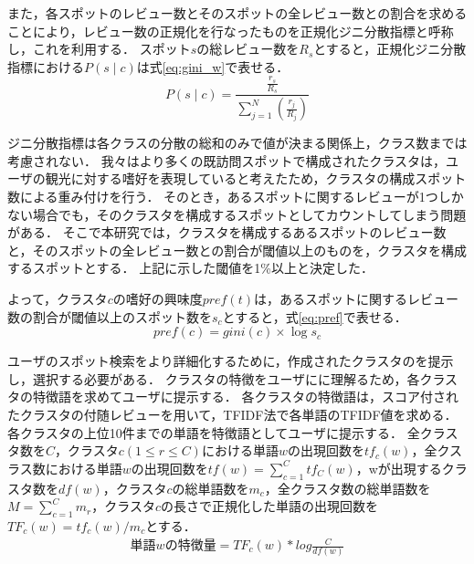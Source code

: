 \documentclass{deimj}
\begin{document}
また，各スポットのレビュー数とそのスポットの全レビュー数との割合を求めることにより，レビュー数の正規化を行なったものを正規化ジニ分散指標と呼称し，これを利用する．
スポット$s$の総レビュー数を$R_s$とすると，正規化ジニ分散指標における$P(s \mid c)$は式\ref{eq:gini_w}で表せる．
\begin{equation}
    P(s \mid c)=\frac {\frac{r_s}{R_s}}{\sum ^{N}_{j=1}\left( \frac {r_j}{R_j}\right)}
    \label{eq:gini_w}
\end{equation}

ジニ分散指標は各クラスの分散の総和のみで値が決まる関係上，クラス数までは考慮されない．
我々はより多くの既訪問スポットで構成されたクラスタは，ユーザの観光に対する嗜好を表現していると考えたため，クラスタの構成スポット数による重み付けを行う．
そのとき，あるスポットに関するレビューが1つしかない場合でも，そのクラスタを構成するスポットとしてカウントしてしまう問題がある．
そこで本研究では，クラスタを構成するあるスポットのレビュー数と，そのスポットの全レビュー数との割合が閾値以上のものを，クラスタを構成するスポットとする．
上記に示した閾値を1\%以上と決定した．

よって，クラスタ$c$の嗜好の興味度$pref(t)$は，あるスポットに関するレビュー数の割合が閾値以上のスポット数を$s_c$とすると，式\ref{eq:pref}で表せる．
\begin{equation}
    pref(c)=gini(c) \times\log s_c
    \label{eq:pref}
\end{equation}

ユーザのスポット検索をより詳細化するために，作成されたクラスタのを提示し，選択する必要がある．
クラスタの特徴をユーザにに理解るため，各クラスタの特徴語を求めてユーザに提示する．
各クラスタの特徴語は，スコア付されたクラスタの付随レビューを用いて，TFIDF法で各単語のTFIDF値を求める．
各クラスタの上位10件までの単語を特徴語としてユーザに提示する．
全クラスタ数を$C$，クラスタ$c(1 \leq r \leq C)$における単語$w$の出現回数を$tf_{c}(w)$，全クスラス数における単語$w$の出現回数を$tf(w)=\sum_{c=1}^{C}tf_{C}(w)$，wが出現するクラスタ数を$df(w)$，クラスタ$c$の総単語数を$m_c$，全クラスタ数の総単語数を$M=\sum_{c=1}^{C}m_r$，クラスタ$c$の長さで正規化した単語の出現回数を$TF_c(w)=tf_c(w)/m_c$とする．
\begin{eqnarray}
単語wの特徴量 = TF_{c}(w) * log\frac{C}{df(w)}
    \label{math:tfidf}
\end{eqnarray}
\end{document}
